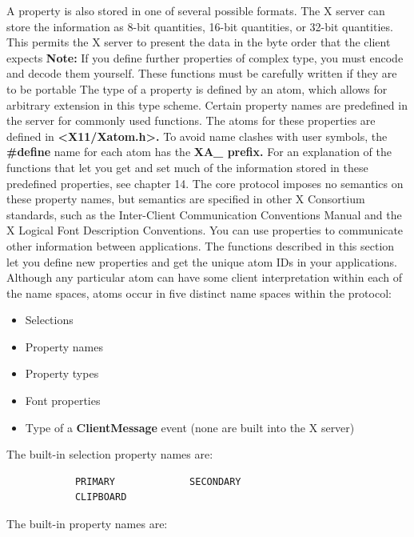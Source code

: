 \documentclass{report}
\begin{document}
\begin{itemize}
        \bigbreak \noindent 
        A property is also stored in one of several possible formats. The X server can store the information as 8-bit quantities, 16-bit quantities, or 32-bit quantities. This permits the X server to present the data in the byte order that the client expects
        \bigbreak \noindent 
        \textbf{Note:} If you define further properties of complex type, you must encode and decode them yourself. These functions must be carefully written if they are to be portable
        \bigbreak \noindent         
        The type of a property is defined by an atom, which allows for arbitrary extension in this type scheme.
        \bigbreak \noindent 
        Certain property names are predefined in the server for commonly used functions. The atoms for these properties are defined in \textbf{<X11/Xatom.h>.} To avoid name clashes with user symbols, the \textbf{\#define} name for each atom has the \textbf{XA\_ prefix.} For an explanation of the functions that let you get and set much of the information stored in these predefined properties, see chapter 14.
        \bigbreak \noindent 
        The core protocol imposes no semantics on these property names, but semantics are specified in other X Consortium standards, such as the Inter-Client Communication Conventions Manual and the X Logical Font Description Conventions.
        \bigbreak \noindent 
        You can use properties to communicate other information between applications. The functions described in this section let you define new properties and get the unique atom IDs in your applications.
        \bigbreak \noindent 
        Although any particular atom can have some client interpretation within each of the name spaces, atoms occur in five distinct name spaces within the protocol:
        \begin{itemize}
            \item Selections
            \item Property names
            \item Property types
            \item Font properties
            \item Type of a \textbf{ClientMessage} event (none are built into the X server)
        \end{itemize}
        The built-in selection property names are:
        \begin{verbatim}
            PRIMARY             SECONDARY
            CLIPBOARD
        \end{verbatim}
        The built-in property names are:

\end{itemize}
\end{document}

